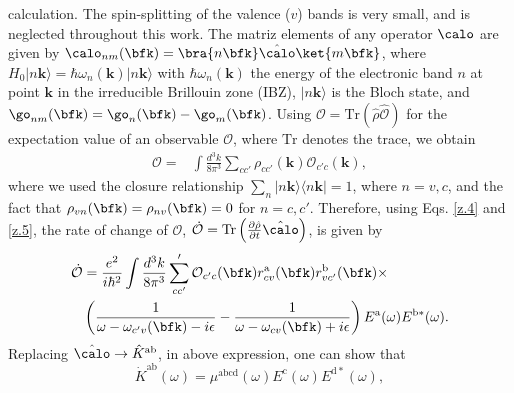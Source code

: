 \documentclass[prb,11pt,tightenlines,twocolumn,aps]{revtex4-1}
\begin{document}
calculation.  The spin-splitting of the valence ($v$) bands is very
small, and is neglected throughout this work.\cite{??} 
The matriz elements of any operator $\calo$ are given by
$\calo_{nm}(\bfk)=\bra{n\bfk}\hat\calo\ket{m\bfk}$,
where 
$H_{0}|n\mathbf{k}\rangle = \hbar \omega_{n}(\mathbf{k})|n\mathbf{k}\rangle$ 
with $\hbar \omega_{n}(\mathbf{k})$ the energy of the
electronic band $n$ at point $\mathbf{k}$ in the irreducible Brillouin zone
(IBZ),  $|n\mathbf{k}\rangle$ is the Bloch state, and 
$\go_{nm}(\bfk)=\go_{n}(\bfk)-\go_{m}(\bfk)$.
Using 
$\mathcal{O} = \mathrm{Tr}(\hat{\rho}\hat{\mathcal{O}})$
for the expectation value of an observable $\mathcal{O}$, 
where $\mathrm{Tr}$ denotes the trace, we obtain
\begin{align}\label{z.5}
\mathcal{O} 
=& 
\int \frac{d^{3}k}{8\pi^{3}} \sum_{cc'} \rho_{cc'}(\mathbf{k}) 
\mathcal{O}_{c'c}(\mathbf{k}),
\end{align}
where we used 
the closure
relationship $\sum_{n}|n\mathbf{k}\rangle \langle n\mathbf{k}| = 1$,
where $n=v,c$,
and the fact that $\rho_{vn}(\bfk)=\rho_{nv}(\bfk)=0$ for $n=c,c'$. 
Therefore, 
using  Eqs. \eqref{z.4} and \eqref{z.5},
the
rate of change of $\mathcal{O}$,
$\dot{\mathcal{O}} 
=
\mathrm{Tr} \left( \frac{\partial \hat{{\rho}}}{\partial t} \hat\calo \right)
$,
 is given by
\begin{align}
\dot{\mathcal{O}} 
&=\frac{e^{2}}{i\hbar^{2}} \int \frac{d^{3}k}{8\pi^{3}} 
\sum'_{cc'} \mathcal{O}_{c'c}(\bfk) 
r^{\mathrm{a}}_{cv}(\bfk)  r^{\mathrm{b}}_{vc'}(\bfk)  \times
\nonumber \\
& \left( \frac{1}{\omega - \omega_{c'v}(\bfk)  - i\epsilon} - 
\frac{1}{\omega - \omega_{cv}(\bfk)  + i\epsilon} \right)
E^{\mathrm{a}}(\omega) E^{\mathrm{b*}}(\omega)
\label{eq:dotO}
.
\end{align}
Replacing  $\hat\calo \rightarrow \hat{K}^{\mathrm{ab}}$, in 
above expression, one can show that
\begin{equation}
\dot{K}^{\mathrm{ab}}(\omega) =
\mu^{\mathrm{abcd}}(\omega)
E^{\mathrm{c}}(\omega) E^{\mathrm{d*}}(\omega),
\label{eq:dotk}
\end{equation}
\end{document}
